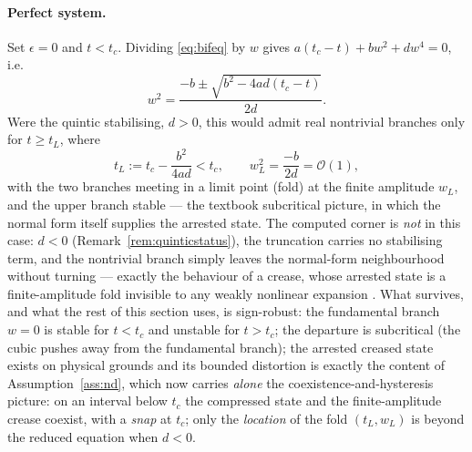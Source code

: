 \paragraph{Perfect system.}
Set $\epsilon=0$ and $t<t_c$. Dividing \eqref{eq:bifeq} by $w$ gives $a(t_c-t)+bw^2+dw^4=0$, i.e.
\begin{equation}
    w^2 = \frac{-b\pm\sqrt{b^2-4ad(t_c-t)}}{2d}.
\end{equation}
Were the quintic stabilising, $d>0$, this would admit real nontrivial branches only for $t\ge t_L$, where
\begin{equation}
    \label{eq:fold}
    t_L := t_c - \frac{b^2}{4ad} < t_c, \qquad w_L^2 = \frac{-b}{2d} = \mathcal{O}(1),
\end{equation}
with the two branches meeting in a limit point (fold) at the finite amplitude $w_L$, and the upper branch stable ---
the textbook subcritical picture, in which the normal form itself supplies the arrested state. The computed corner is
\emph{not} in this case: $d<0$ (Remark~\ref{rem:quinticstatus}), the truncation carries no stabilising term, and the
nontrivial branch simply leaves the normal-form neighbourhood without turning --- exactly the behaviour of a crease,
whose arrested state is a finite-amplitude fold invisible to any weakly nonlinear expansion \cite{Hong2009}. What
survives, and what the rest of this section uses, is sign-robust: the fundamental branch $w=0$ is stable for $t<t_c$
and unstable for $t>t_c$; the departure is subcritical (the cubic pushes away from the fundamental branch); the
arrested creased state exists on physical grounds and its bounded distortion is exactly the content of
Assumption~\ref{ass:nd}, which now carries \emph{alone} the coexistence-and-hysteresis picture: on an interval below
$t_c$ the compressed state and the finite-amplitude crease coexist, with a \emph{snap} at $t_c$; only the
\emph{location} of the fold $(t_L,w_L)$ is beyond the reduced equation when $d<0$.

